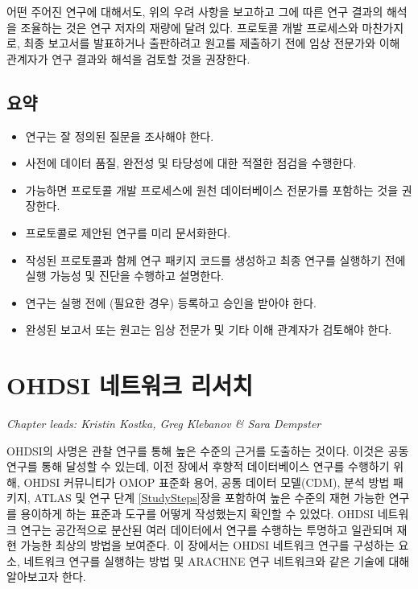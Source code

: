 \documentclass[10.5pt]{book}
\providecommand{\tightlist}{%
  \setlength{\itemsep}{0pt}\setlength{\parskip}{0pt}}
\theoremstyle{definition}
\theoremstyle{definition}
\theoremstyle{definition}
\theoremstyle{remark}
\let\BeginKnitrBlock\begin \let\EndKnitrBlock\end
\begin{document}
어떤 주어진 연구에 대해서도, 위의 우려 사항을 보고하고 그에 따른 연구
결과의 해석을 조율하는 것은 연구 저자의 재량에 달려 있다. 프로토콜 개발
프로세스와 마찬가지로, 최종 보고서를 발표하거나 출판하려고 원고를
제출하기 전에 임상 전문가와 이해 관계자가 연구 결과와 해석을 검토할 것을
권장한다.

\section{요약}\label{-17}

\BeginKnitrBlock{rmdsummary}
\begin{itemize}
\tightlist
\item
  연구는 잘 정의된 질문을 조사해야 한다.
\item
  사전에 데이터 품질, 완전성 및 타당성에 대한 적절한 점검을 수행한다.
\item
  가능하면 프로토콜 개발 프로세스에 원천 데이터베이스 전문가를 포함하는
  것을 권장한다.
\item
  프로토콜로 제안된 연구를 미리 문서화한다.
\item
  작성된 프로토콜과 함께 연구 패키지 코드를 생성하고 최종 연구를
  실행하기 전에 실행 가능성 및 진단을 수행하고 설명한다.
\item
  연구는 실행 전에 (필요한 경우) 등록하고 승인을 받아야 한다.
\item
  완성된 보고서 또는 원고는 임상 전문가 및 기타 이해 관계자가 검토해야
  한다.
\end{itemize}
\EndKnitrBlock{rmdsummary}

\chapter{OHDSI 네트워크 리서치}\label{NetworkResearch}

\emph{Chapter leads: Kristin Kostka, Greg Klebanov \& Sara Dempster}

OHDSI의 사명은 관찰 연구를 통해 높은 수준의 근거를 도출하는 것이다.
이것은 공동 연구를 통해 달성할 수 있는데, 이전 장에서 후향적
데이터베이스 연구를 수행하기 위해, OHDSI 커뮤니티가 OMOP 표준화 용어,
공통 데이터 모델(CDM), 분석 방법 패키지, ATLAS 및 연구 단계
\ref{StudySteps}장을 포함하여 높은 수준의 재현 가능한 연구를 용이하게
하는 표준과 도구를 어떻게 작성했는지 확인할 수 있었다. OHDSI 네트워크
연구는 공간적으로 분산된 여러 데이터에서 연구를 수행하는 투명하고
일관되며 재현 가능한 최상의 방법을 보여준다. 이 장에서는 OHDSI 네트워크
연구를 구성하는 요소, 네트워크 연구를 실행하는 방법 및 ARACHNE 연구
네트워크와 같은 기술에 대해 알아보고자 한다.
\end{document}
